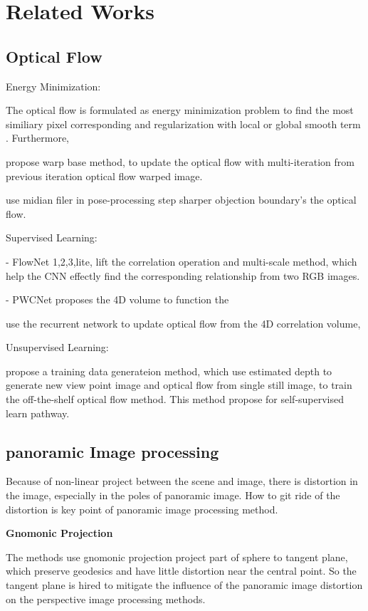 \section{Related Works}


\subsection{Optical Flow}

Energy Minimization:

The optical flow is formulated as energy minimization problem to find the most similiary pixel corresponding and regularization with local or global smooth term \cite{DIS, HS, BA}. Furthermore, 

\cite{Borx} propose warp base method, to update the optical flow with multi-iteration from previous iteration optical flow warped image.

\cite{sun} use midian filer in pose-processing step sharper objection boundary's the optical flow.

Supervised Learning:

- FlowNet 1,2,3,lite, lift the correlation operation and multi-scale method, which help the CNN effectly find the corresponding relationship from two RGB images. 

- PWCNet proposes the 4D volume to function the 

\cite{teed2020raft} use the recurrent network to update optical flow from the 4D correlation volume, 

Unsupervised Learning:

\cite{aleotti2021learning} propose a training data generateion method, 
which use estimated depth to generate new view point image and optical flow from single still image, to train the off-the-shelf optical flow method.
This method propose for self-supervised learn pathway.

\subsection{panoramic Image processing}

Because of non-linear project between the scene and image, there is distortion in the image, especially in the poles of panoramic image.
How to git ride of the distortion is key point of panoramic image processing method. 

\textbf{Gnomonic Projection} ~\cite{gnomonicprojection}

The methods use gnomonic projection project part of sphere to tangent plane, which preserve geodesics and have little distortion near the central point.
So the tangent plane is hired to mitigate the influence of the panoramic image  distortion on the perspective image processing methods.

